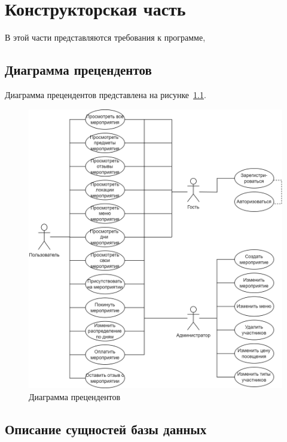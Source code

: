 \chapter{Конструкторская часть}

В этой части представляются требования к программе,

\section{Диаграмма прецендентов}

Диаграмма прецендентов представлена на рисунке~\ref{fig:use-case-diagram}.

\begin{figure}[h!]
	\centering
	\includegraphics[width=1\textwidth]{images/use-case-diagram.png}
	\caption{Диаграмма прецендентов} 
	\label{fig:use-case-diagram} 
\end{figure}

\section{Описание сущностей базы данных}

